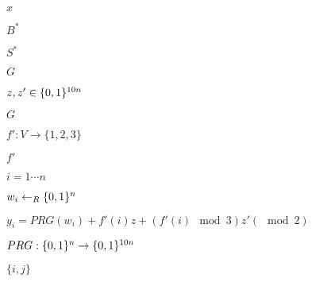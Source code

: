 \documentclass[10pt]{book}
\begin{document}
\begin{mdSnippets}
\begin{mdInlineSnippet}[9dd4e461268c8034f5c8564e155c67a6]
$x$\end{mdInlineSnippet}%
\begin{mdInlineSnippet}[5a4ca52d2f97862828a67f2bd32fa20b]%
$B^*$\end{mdInlineSnippet}%
\begin{mdInlineSnippet}[c4317e7a89e36bc1b16822e61435ddfc]%
$S^*$\end{mdInlineSnippet}%
\begin{mdInlineSnippet}[dfcf28d0734569a6a693bc8194de62bf]%
$G$\end{mdInlineSnippet}%
\begin{mdInlineSnippet}[13bf55d5de0e0c0201061db5cbe57aa1]%
$z,z' \in \{0,1\}^{10n}$\end{mdInlineSnippet}%
\begin{mdInlineSnippet}[dfcf28d0734569a6a693bc8194de62bf]%
$G$\end{mdInlineSnippet}%
\begin{mdInlineSnippet}[ebd9df344c9d0f482c70c546ed01842b]%
$f': V \to \{1,2,3\}$\end{mdInlineSnippet}%
\begin{mdInlineSnippet}[6bda8af54c40bc23ed858e9e9f5c11d2]%
$f'$\end{mdInlineSnippet}%
\begin{mdInlineSnippet}[b6a25df1108ccfe8ff6a718b1c801c89]%
$i = 1\cdots n$\end{mdInlineSnippet}%
\begin{mdInlineSnippet}[864d4eae9883092560b1f36a9b7ef407]%
$w_i \gets_R \{0,1\}^n$\end{mdInlineSnippet}%
\begin{mdInlineSnippet}[90a6aade130152a67319c6f8d1fc8d92]%
$y_i = PRG(w_i) + f'(i)z + (f'(i) \mod 3)z'(\mod 2)$\end{mdInlineSnippet}%
\begin{mdInlineSnippet}[5d756f7982f06077313e248db970071b]%
$PRG : \{0,1\}^n \to \{0,1\}^{10n}$\end{mdInlineSnippet}%
\begin{mdInlineSnippet}%
$\{i,j\}$\end{mdInlineSnippet}%
\begin{mdInlineSnippet}[5a4ca52d2f97862828a67f2bd32fa20b]%

\end{mdInlineSnippet}
\end{mdSnippets}
\end{document}
